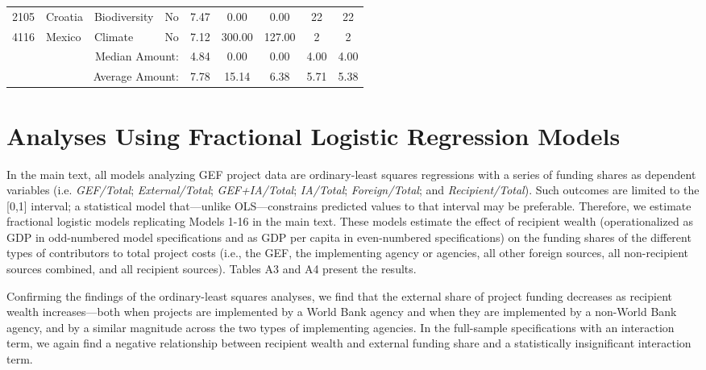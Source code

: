 \documentclass{article}
\begin{document}
\begin{singlespace}
\begin{table}[H]
{\begin{tabular}{lllcccccc}
	\rowcolor[HTML]{EFEFEF} 
	2105 & Croatia & Biodiversity & No & 7.47 & 0.00 & 0.00 & 22 & 22 \\
	4116 & Mexico & Climate & No & 7.12 & 300.00 & 127.00 & 2 & 2 \\ \hline
	\multicolumn{4}{r}{Median Amount:} & 4.84 & 0.00 & 0.00 & 4.00 & 4.00 \\
	\multicolumn{4}{r}{Average Amount:} & 7.78 & 15.14 & 6.38 & 5.71 & 5.38 \\ \hline
\end{tabular}%
}
\end{table}
\end{singlespace}							

\section{Analyses Using Fractional Logistic Regression Models} 
In the main text, all models analyzing GEF project data are ordinary-least squares regressions with a series of funding shares as dependent variables (i.e. \textit{GEF/Total}; \textit{External/Total}; \textit{GEF+IA/Total}; \textit{IA/Total}; \textit{Foreign/Total}; and \textit{Recipient/Total}).  Such outcomes are limited to the [0,1] interval; a statistical model that---unlike OLS---constrains predicted values to that interval may be preferable.  Therefore, we estimate fractional logistic models replicating Models 1-16 in the main text.  These models estimate the effect of recipient wealth (operationalized as GDP in odd-numbered model specifications and as GDP per capita in even-numbered specifications) on the funding shares of the different types of contributors to total project costs (i.e., the GEF, the implementing agency or agencies, all other foreign sources, all non-recipient sources combined, and all recipient sources). Tables A3 and A4 present the results. 

Confirming the findings of the ordinary-least squares analyses, we find that the external share of project funding decreases as recipient wealth increases---both when projects are implemented by a World Bank agency and when they are implemented by a non-World Bank agency, and by a similar magnitude across the two types of implementing agencies.  In the full-sample specifications with an interaction term, we again find a negative relationship between recipient wealth and external funding share and a statistically insignificant interaction term. 
\end{document}
